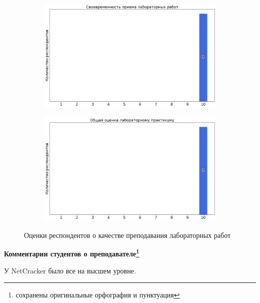 \begin{figure}[H]
\begin{subfigure}[b]{0.45\textwidth}
                \includegraphics[width=\textwidth]{images/3 course/Лаборатория инфокоммуникационных технологий/labniks-marks-NetCracker-2.png}
            \end{subfigure}
            \begin{subfigure}[b]{0.45\textwidth}
                \centering
                \includegraphics[width=\textwidth]{images/3 course/Лаборатория инфокоммуникационных технологий/labniks-marks-NetCracker-3.png}
            \end{subfigure}	
            \caption{Оценки респондентов о качестве преподавания лабораторных работ}
        \end{figure}

        \textbf{Комментарии студентов о преподавателе\protect\footnote{сохранены оригинальные орфография и пунктуация}}
            \begin{commentbox} 
                У NetCracker было все на высшем уровне. 
            \end{commentbox} 
        
